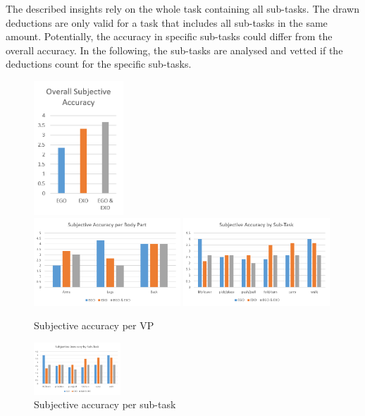 The described insights rely on the whole task containing all sub-tasks. The drawn deductions are only valid for a task that includes all sub-tasks in the same amount. Potentially, the accuracy in specific sub-tasks could differ from the overall accuracy. In the following, the sub-tasks are analysed and vetted if the deductions count for the specific sub-tasks.
\begin{figure}[H]
	\centering
	\includegraphics[width=0.3\textwidth]{figures/overallSubjectiveAccuracy.png}\\ 
	\includegraphics[width=0.49\textwidth]{figures/subjectiveAccuracyPerBodyPart.png}
	\includegraphics[width=0.49\textwidth]{figures/subjectiveAccuracyBySubTask.png}
	\caption[Subjective accuracy per VP]{Subjective accuracy per VP}
	\label{fig:overallSubjectiveAccuracy}
\end{figure}

\begin{figure}[H]
	\centering
	\includegraphics[width=0.29\textwidth]{figures/subjectiveAccuracyBySubTask.png}
	\caption[Subjective accuracy per sub-task]{Subjective accuracy per sub-task}
	\label{fig:subjectiveAccuracybySubTask}
\end{figure}

